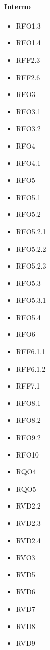 \paragraph{Interno}
\quad
\begin{multicols}{3}
    \begin{itemize}
        \item RFO1.3
        \item RFO1.4
        \item RFF2.3
        \item RFF2.6
        \item RFO3
        \item RFO3.1
        \item RFO3.2
        \item RFO4
        \item RFO4.1
        \item RFO5
        \item RFO5.1
        \item RFO5.2
        \item RFO5.2.1
        \item RFO5.2.2
        \item RFO5.2.3
        \item RFO5.3
        \item RFO5.3.1
        \item RFO5.4
        \item RFO6
        \item RFF6.1.1
        \item RFF6.1.2
        \item RFF7.1
        \item RFO8.1
        \item RFO8.2
        \item RFO9.2
        \item RFO10
        \item RQO4
        \item RQO5
        \item RVD2.2
        \item RVD2.3
        \item RVD2.4
        \item RVO3
        \item RVD5
        \item RVD6
        \item RVD7
        \item RVD8
        \item RVD9
    \end{itemize}
\end{multicols}

